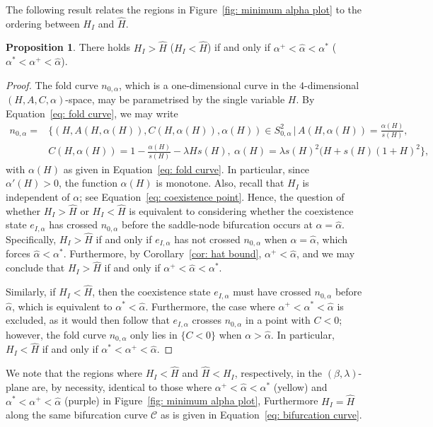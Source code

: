 \documentclass{article}
\theoremstyle{definition}
\numberwithin{equation}{section}
\newtheorem{prop}{Proposition}
\begin{document}
The following result relates the regions in Figure~\ref{fig: minimum alpha plot} to the ordering between $H_I$ and $\hat{H}$. 
\begin{prop} There holds $H_I>\hat{H}$ ($H_I<\hat{H}$) if and only if $\alpha^+<\hat{\alpha}<\alpha^{\ast}$ ($\alpha^{\ast}<\alpha^+<\hat{\alpha}$).
\label{prop: ordering}
\end{prop}
\begin{proof}
The fold curve $n_{0,\alpha}$, which is a one-dimensional curve in the $4$-dimensional $(H,A,C,\alpha)$-space, may be parametrised by the single variable $H$. By Equation~\eqref{eq: fold curve}, we may write
 \begin{equation}
 \begin{split}
     n_{0,\alpha}=&\biggl\{(H,A(H,\alpha(H)),C(H,\alpha(H)),\alpha(H))\in S_{0,\alpha}^{2}\,\bigg|\,  A(H,\alpha(H))=\frac{\alpha(H)}{s(H)}, \\ & C(H,\alpha(H))=1-\frac{\alpha(H)}{s(H)}-\lambda Hs(H),\ \alpha(H)=\lambda s(H)^2(H+s(H)(1+H)^2\biggr\},
     \label{eq: fold curve param}
\end{split}
 \end{equation}
with $\alpha(H)$ as given in Equation~\eqref{eq: fold curve}. In particular, since $\alpha'(H)>0$, the function $\alpha(H)$ is monotone. Also, recall that $H_I$ is independent of $\alpha$; see Equation~\eqref{eq: coexistence point}. Hence, the question of whether $H_I>\hat{H}$ or $H_I<\hat{H}$ is equivalent to considering whether the coexistence state $e_{I,\alpha}$ has crossed $n_{0,\alpha}$ before the saddle-node bifurcation occurs at $\alpha=\hat{\alpha}$. Specifically, $H_I>\hat{H}$ if and only if $e_{I,\alpha}$ has not crossed $n_{0,\alpha}$ when $\alpha=\hat{\alpha}$, which forces $\hat\alpha<\alpha^\ast$. Furthermore, by Corollary~\ref{cor: hat bound}, $\alpha^+<\hat\alpha$, and we may conclude that $H_I>\hat{H}$ if and only if $\alpha^+<\hat{\alpha}<\alpha^{\ast}$.

Similarly, if $H_I<\hat{H}$, then the coexistence state $e_{I,\alpha}$ must have crossed $n_{0,\alpha}$ before $\hat\alpha$, which is equivalent to $\alpha^{\ast}<\hat\alpha$. Furthermore, the case where $\alpha^+<\alpha^{\ast}<\hat\alpha$ is excluded, as it would then follow that $e_{I,\alpha}$ crosses $n_{0,\alpha}$ in a point with $C<0$; however, the fold curve $n_{0,\alpha}$ only lies in $\{C<0\}$ when $\alpha>\hat\alpha$. In particular, $H_I<\hat{H}$ if and only if $\alpha^{\ast}<\alpha^+<\hat\alpha$. 
\end{proof}
We note that the regions where $H_I<\hat{H}$ and $\hat{H}<H_I$, respectively, in the $(\beta,\lambda)$-plane are, by necessity, identical to those where $\alpha^+<\hat{\alpha}<\alpha^{\ast}$ (yellow) and $\alpha^{\ast}<\alpha^+<\hat{\alpha}$ (purple) in Figure~\ref{fig: minimum alpha plot}, Furthermore $H_I=\hat{H}$ along the same bifurcation curve $\mathcal{C}$ as is given in Equation~\eqref{eq: bifurcation curve}.
\end{document}
